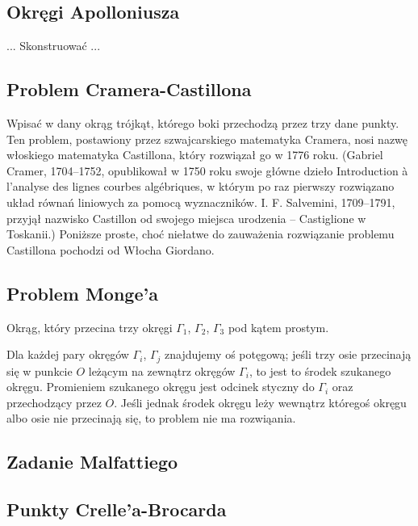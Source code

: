 \subsection{Okręgi Apolloniusza}

\begin{problem}
    \label{problem_apolloniusza}%
    ...
    Skonstruować ...
\end{problem}

\subsection{Problem Cramera-Castillona}
Wpisać w dany okrąg trójkąt, którego boki przechodzą przez trzy dane punkty.
Ten problem, postawiony przez szwajcarskiego matematyka Cramera, nosi nazwę włoskiego matematyka Castillona, który rozwiązał go w 1776 roku.
(Gabriel Cramer, 1704–1752, opublikował w 1750 roku swoje główne dzieło Introduction à l’analyse des lignes courbes algébriques, w którym po raz pierwszy rozwiązano układ równań liniowych za pomocą wyznaczników.
I. F. Salvemini, 1709–1791, przyjął nazwisko Castillon od swojego miejsca urodzenia – Castiglione w Toskanii.)
Poniższe proste, choć niełatwe do zauważenia rozwiązanie problemu Castillona pochodzi od Włocha Giordano.

\subsection{Problem Monge'a}
\begin{problem}[Monge'a?]
    Okrąg, który przecina trzy okręgi $\Gamma_1$, $\Gamma_2$, $\Gamma_3$ pod kątem prostym.
\end{problem}

Dla każdej pary okręgów $\Gamma_i$, $\Gamma_j$ znajdujemy oś potęgową; jeśli trzy osie przecinają się w punkcie $O$ leżącym na zewnątrz okręgów $\Gamma_i$, to jest to środek szukanego okręgu.
Promieniem szukanego okręgu jest odcinek styczny do $\Gamma_i$ oraz przechodzący przez $O$.
Jeśli jednak środek okręgu leży wewnątrz któregoś okręgu albo osie nie przecinają się, to problem nie ma rozwiąania.

\subsection{Zadanie Malfattiego}


\subsection{Punkty Crelle'a-Brocarda}
